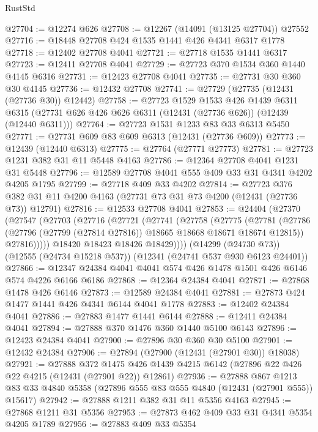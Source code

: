 \begin{lexlean}{RustStd}
\begin{coremodule}
@27704 := @12274 @626
@27708 := @12267 (@14091 (@13125 @27704)) @27552
@27716 := @18448 @27708 @424 @1535 @1441 @426 @4341 @6317 @1778
@27718 := @12402 @27708 @4041
@27721 := @27718 @1535 @1441 @6317
@27723 := @12411 @27708 @4041
@27729 := @27723 @370 @1534 @360 @1440 @4145 @6316
@27731 := @12423 @27708 @4041
@27735 := @27731 @30 @360 @30 @4145
@27736 := @12432 @27708
@27741 := @27729 (@27735 (@12431 (@27736 @30)) @12442)
@27758 := @27723
    @1529
    @1533
    @426
    @1439
    @6311
    @6315
    (@27731 @626 @426 @626 @6311 (@12431 (@27736 @626)) (@12439 (@12440 @6311)))
@27764 := @27723 @1531 @1233 @83 @33 @6313 @5450
@27771 := @27731 @609 @83 @609 @6313 (@12431 (@27736 @609))
@27773 := @12439 (@12440 @6313)
@27775 := @27764 (@27771 @27773)
@27781 := @27723 @1231 @382 @31 @11 @5448 @4163
@27786 := @12364 @27708 @4041 @1231 @31 @5448
@27796 := @12589 @27708 @4041 @555 @409 @33 @31 @4341 @4202 @4205 @1795
@27799 := @27718 @409 @33 @4202
@27814 := @27723
    @376
    @382
    @31
    @11
    @4200
    @4163
    (@27731 @73 @31 @73 @4200 (@12431 (@27736 @73)) @12791)
@27816 := @12533 @27708 @4041
@27853 := @24404
    (@27370
      (@27547
        (@27703
          (@27716
            (@27721
              (@27741
                (@27758
                  (@27775
                    (@27781
                      (@27786 (@27796 (@27799 (@27814 @27816)) @18665 @18668 @18671 @18674 @12815))
                      @27816)))))
            @18420
            @18423
            @18426
            @18429))))
    (@14299 (@24730 @73))
    (@12555 (@24734 @15218 @537))
    (@12341 (@24741 @537 @930 @6123 @24401))
@27866 := @12347 @24384 @4041 @4041 @574 @426 @1478 @1501 @426 @6146 @574 @4226 @6166 @6186
@27868 := @12364 @24384 @4041
@27871 := @27868 @1478 @426 @6146
@27873 := @12589 @24384 @4041
@27881 := @27873 @424 @1477 @1441 @426 @4341 @6144 @4041 @1778
@27883 := @12402 @24384 @4041
@27886 := @27883 @1477 @1441 @6144
@27888 := @12411 @24384 @4041
@27894 := @27888 @370 @1476 @360 @1440 @5100 @6143
@27896 := @12423 @24384 @4041
@27900 := @27896 @30 @360 @30 @5100
@27901 := @12432 @24384
@27906 := @27894 (@27900 (@12431 (@27901 @30)) @18038)
@27921 := @27888
    @372
    @1475
    @426
    @1439
    @4215
    @6142
    (@27896 @22 @426 @22 @4215 (@12431 (@27901 @22)) @12861)
@27936 := @27888
    @867
    @1213
    @83
    @33
    @4840
    @5358
    (@27896 @555 @83 @555 @4840 (@12431 (@27901 @555)) @15617)
@27942 := @27888 @1211 @382 @31 @11 @5356 @4163
@27945 := @27868 @1211 @31 @5356
@27953 := @27873 @462 @409 @33 @31 @4341 @5354 @4205 @1789
@27956 := @27883 @409 @33 @5354

\end{coremodule}
\end{lexlean}
